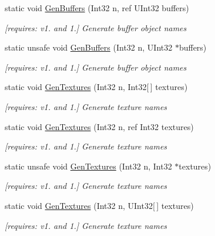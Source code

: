 \begin{DoxyCompactItemize}
static void \hyperlink{class_open_t_k_1_1_graphics_1_1_e_s11_1_1_g_l_a1f6a6f5cbb786d576ef52ac9089ba7a3}{Gen\-Buffers} (Int32 n, ref U\-Int32 buffers)
\begin{DoxyCompactList}\small\item\em \mbox{[}requires\-: v1. and 1.\mbox{]} Generate buffer object names \end{DoxyCompactList}\item 
static unsafe void \hyperlink{class_open_t_k_1_1_graphics_1_1_e_s11_1_1_g_l_a92221b43b10506b0022a9003e9c077a4}{Gen\-Buffers} (Int32 n, U\-Int32 $\ast$buffers)
\begin{DoxyCompactList}\small\item\em \mbox{[}requires\-: v1. and 1.\mbox{]} Generate buffer object names \end{DoxyCompactList}\item 
static void \hyperlink{class_open_t_k_1_1_graphics_1_1_e_s11_1_1_g_l_ac884f10d074374c33e0bf81353f4e9c0}{Gen\-Textures} (Int32 n, Int32\mbox{[}$\,$\mbox{]} textures)
\begin{DoxyCompactList}\small\item\em \mbox{[}requires\-: v1. and 1.\mbox{]} Generate texture names \end{DoxyCompactList}\item 
static void \hyperlink{class_open_t_k_1_1_graphics_1_1_e_s11_1_1_g_l_a18b958b8f0c38809a813cfe24e939b45}{Gen\-Textures} (Int32 n, ref Int32 textures)
\begin{DoxyCompactList}\small\item\em \mbox{[}requires\-: v1. and 1.\mbox{]} Generate texture names \end{DoxyCompactList}\item 
static unsafe void \hyperlink{class_open_t_k_1_1_graphics_1_1_e_s11_1_1_g_l_aef8c38b480f60f4406c52dcb09909541}{Gen\-Textures} (Int32 n, Int32 $\ast$textures)
\begin{DoxyCompactList}\small\item\em \mbox{[}requires\-: v1. and 1.\mbox{]} Generate texture names \end{DoxyCompactList}\item 
static void \hyperlink{class_open_t_k_1_1_graphics_1_1_e_s11_1_1_g_l_a54c9f1e6ee7381cf2fb8904bfb73d1cf}{Gen\-Textures} (Int32 n, U\-Int32\mbox{[}$\,$\mbox{]} textures)
\begin{DoxyCompactList}\small\item\em \mbox{[}requires\-: v1. and 1.\mbox{]} Generate texture names \end{DoxyCompactList}\item 

\end{DoxyCompactItemize}
